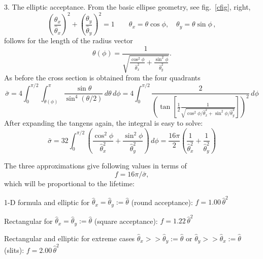 \documentclass[12pt]{article}
\newcommand\beq{\begin{equation}}
\newcommand\eeq{\end{equation}}
\begin{document}
3. The elliptic acceptance. From the basic ellipse geometry, see fig.~\ref{cfig}, right,
\beq
\left(\frac{\theta_x}{\hat\theta_x}\right)^2+\left(\frac{\theta_y}{\hat\theta_y}\right)^2=1\qquad \theta_x=\theta\cos\phi,\quad\theta_y=\theta\sin\phi\, ,
\eeq
follows for the length of the radius vector
\beq
\theta(\phi)=\frac{1}{\sqrt{\frac{\cos^2\phi}{\hat\theta_x^2}+\frac{\sin^2\phi}{\hat\theta_y^2}}} .
\eeq
As before the cross section is obtained from the four quadrants
\beq
\bar\sigma = 4 \int_0^{\pi/2} \int_{\theta(\phi)}^{\pi} \frac{\sin\theta}{\sin^4(\theta/2)}\, d\theta\, d\phi
= 4 \int_0^{\pi/2} \frac{2}{\left( \tan \left[ \frac{1}{2} \frac{1}{\sqrt{\cos^2\phi / \hat\theta_x^2+\sin^2\phi / \hat\theta_y^2}}   \right] \right)^2 }\, d\phi
\eeq
After expanding the tangens again, the integral is easy to solve:
\beq\label{sigelli}
\bar\sigma = 32 \int_0^{\pi/2} \left( \frac{\cos^2\phi}{\hat\theta_x^2}+\frac{\sin^2\phi}{\hat\theta_y^2}  \right) \, d\phi =
\frac{16\pi}{2} \left( \frac{1}{\hat\theta_x^2}+\frac{1}{\hat\theta_y^2}\right)
\eeq

The three approximations give following values in terms of
\beq\label{smallf}
f=16\pi/\bar\sigma ,
\eeq
which will be proportional to the lifetime:

1-D formula and elliptic for $\hat\theta_x=\hat\theta_y:=\hat\theta$ (round acceptance): $f=1.00\,\hat\theta^2$

Rectangular for $\hat\theta_x=\hat\theta_y:=\hat\theta$ (square acceptance): $f=1.22\,\hat\theta^2$

Rectangular and elliptic for extreme cases $\hat\theta_x >> \hat\theta_y:=\hat\theta$ or $\hat\theta_y >> \hat\theta_x:=\hat\theta$ (slits):  $f = 2.00\,\hat\theta^2$ \\
\end{document}
